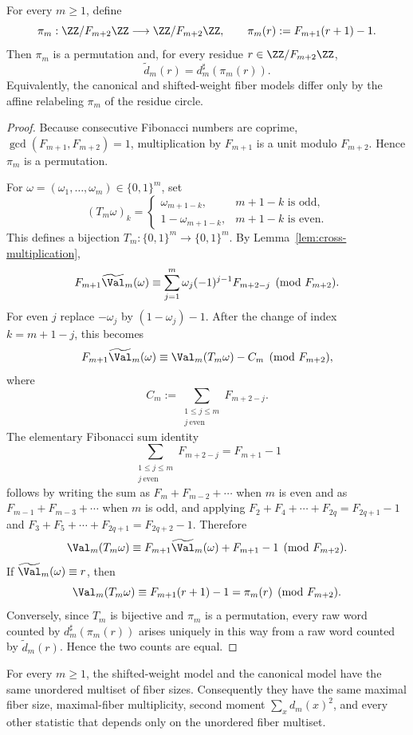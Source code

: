 \begin{theorem}\label{thm:affine-transfer}
For every $m\ge1$, define
\[
\pi_m:\ZZ/F_{m+2}\ZZ\longrightarrow \ZZ/F_{m+2}\ZZ,
\qquad
\pi_m(r):=F_{m+1}(r+1)-1.
\]
Then $\pi_m$ is a permutation and, for every residue
$r\in\ZZ/F_{m+2}\ZZ$,
\[
\widetilde d_m(r)=d_m^\sharp(\pi_m(r)).
\]
Equivalently, the canonical and shifted-weight fiber models differ only by
the affine relabeling $\pi_m$ of the residue circle.
\end{theorem}

\begin{proof}
Because consecutive Fibonacci numbers are coprime,
$\gcd(F_{m+1},F_{m+2})=1$, multiplication by $F_{m+1}$ is a unit modulo
$F_{m+2}$.  Hence $\pi_m$ is a permutation.

For $\omega=(\omega_1,\ldots,\omega_m)\in\{0,1\}^m$, set
\[
(T_m\omega)_k=
\begin{cases}
\omega_{m+1-k}, & m+1-k\text{ is odd},\\
1-\omega_{m+1-k}, & m+1-k\text{ is even}.
\end{cases}
\]
This defines a bijection $T_m:\{0,1\}^m\to\{0,1\}^m$.  By
Lemma~\ref{lem:cross-multiplication},
\[
F_{m+1}\widetilde{\Val}_m(\omega)
\equiv
\sum_{j=1}^m \omega_j(-1)^{j-1}F_{m+2-j}
\pmod {F_{m+2}}.
\]
For even $j$ replace $-\omega_j$ by $(1-\omega_j)-1$.  After the change of
index $k=m+1-j$, this becomes
\[
F_{m+1}\widetilde{\Val}_m(\omega)
\equiv
\Val_m(T_m\omega)-C_m
\pmod {F_{m+2}},
\]
where
\[
C_m:=\sum_{\substack{1\le j\le m\\ j\ \mathrm{even}}} F_{m+2-j}.
\]
The elementary Fibonacci sum identity
\[
\sum_{\substack{1\le j\le m\\ j\ \mathrm{even}}} F_{m+2-j}=F_{m+1}-1
\]
follows by writing the sum as
$F_{m}+F_{m-2}+\cdots$ when $m$ is even and as
$F_{m-1}+F_{m-3}+\cdots$ when $m$ is odd, and applying
$F_2+F_4+\cdots+F_{2q}=F_{2q+1}-1$ and
$F_3+F_5+\cdots+F_{2q+1}=F_{2q+2}-1$.  Therefore
\[
\Val_m(T_m\omega)
\equiv
F_{m+1}\widetilde{\Val}_m(\omega)+F_{m+1}-1
\pmod {F_{m+2}}.
\]
If $\widetilde{\Val}_m(\omega)\equiv r$, then
\[
\Val_m(T_m\omega)\equiv F_{m+1}(r+1)-1=\pi_m(r)
\pmod {F_{m+2}}.
\]
Conversely, since $T_m$ is bijective and $\pi_m$ is a permutation, every raw
word counted by $d_m^\sharp(\pi_m(r))$ arises uniquely in this way from a raw
word counted by $\widetilde d_m(r)$.  Hence the two counts are equal.
\end{proof}

\begin{corollary}\label{cor:affine-transfer-stats}
For every $m\ge1$, the shifted-weight model and the canonical model have the
same unordered multiset of fiber sizes.  Consequently they have the same
maximal fiber size, maximal-fiber multiplicity, second moment
$\sum_xd_m(x)^2$, and every other statistic that depends only on the unordered
fiber multiset.
\end{corollary}

